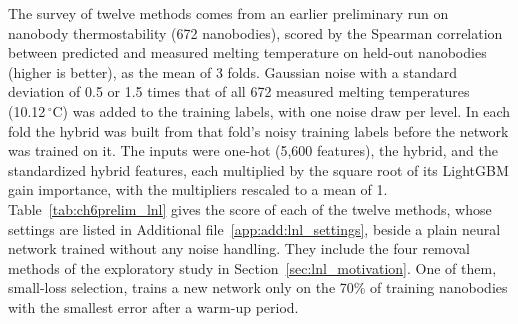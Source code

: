The survey of twelve methods comes from an earlier preliminary run on nanobody thermostability (672 nanobodies), scored by the Spearman correlation between predicted and measured melting temperature on held-out nanobodies (higher is better), as the mean of 3 folds. Gaussian noise with a standard deviation of 0.5 or 1.5 times that of all 672 measured melting temperatures (10.12\,$^\circ$C) was added to the training labels, with one noise draw per level. In each fold the hybrid was built from that fold's noisy training labels before the network was trained on it. The inputs were one-hot (5,600 features), the hybrid, and the standardized hybrid features, each multiplied by the square root of its LightGBM gain importance, with the multipliers rescaled to a mean of 1. Table~\ref{tab:ch6prelim_lnl} gives the score of each of the twelve methods, whose settings are listed in Additional file~\ref{app:add:lnl_settings}, beside a plain neural network trained without any noise handling. They include the four removal methods of the exploratory study in Section~\ref{sec:lnl_motivation}. One of them, small-loss selection, trains a new network only on the 70\% of training nanobodies with the smallest error after a warm-up period.

